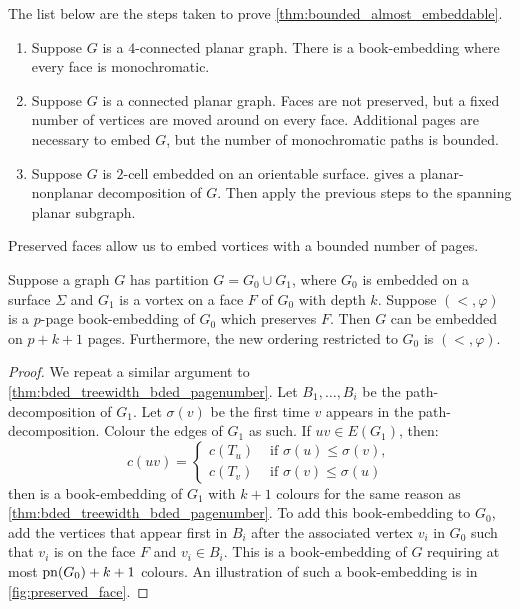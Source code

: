 The list below are the steps taken to prove \cref{thm:bounded_almost_embeddable}.
\begin{enumerate}
	\item Suppose $G$ is a \(4\)-connected planar graph. There is a book-embedding where every face is monochromatic. 
	\item Suppose \(G\) is a connected planar graph. Faces are not preserved, but a fixed number of vertices are moved around on every face. Additional pages are necessary to embed $G$, but the number of monochromatic paths is bounded. 
	\item Suppose \(G\) is $2$-cell embedded on an orientable surface. \textcite{heathPagenumberGenusGraphs1992} gives a planar-nonplanar decomposition of $G$. Then apply the previous steps to the spanning planar subgraph.
\end{enumerate}

Preserved faces allow us to embed vortices with a bounded number of pages. 

\begin{lemma}\label{lem:preserved_faces_pagenumber}
	Suppose a graph \(G\) has partition \(G = G_0 \cup G_1\), where \(G_0\) is embedded on a surface $\Sigma$ and \(G_1\) is a vortex on a face $F$ of $G_0$ with depth \(k\). Suppose $(<, \varphi)$ is a $p$-page book-embedding of \(G_0\) which preserves \(F\). Then $G$ can be embedded on \(p + k + 1\) pages. Furthermore, the new ordering restricted to $G_0$ is $(<, \varphi)$.
\end{lemma}

\begin{proof}
	We repeat a similar argument to \cref{thm:bded_treewidth_bded_pagenumber}. Let \(B_1, \ldots, B_i\) be the path-decomposition of \(G_1\). Let \(\sigma(v)\) be the first time \(v\) appears in the path-decomposition. Colour the edges of \(G_1\) as such. If \(uv \in E(G_1)\), then:
	\begin{equation}
		c(uv) =
		\begin{cases}
			c(T_u) & \text{ if } \sigma(u) \leq \sigma(v), \\
			c(T_v) & \text{ if } \sigma(v) \leq \sigma(u)
		\end{cases}
	\end{equation}
	then is a book-embedding of \(G_1\) with \(k+1\) colours for the same reason as \cref{thm:bded_treewidth_bded_pagenumber}.
	To add this book-embedding to \(G_0\), add the vertices that appear first in \(B_i\) after the associated vertex \(v_i\) in \(G_0\) such that \(v_i\) is on the face \(F\) and \(v_i \in B_i\). This is a book-embedding of \(G\) requiring at most \(\operatorname{pn}(G_0) + k + 1\) colours. An illustration of such a book-embedding is in \cref{fig:preserved_face}.
\end{proof}

